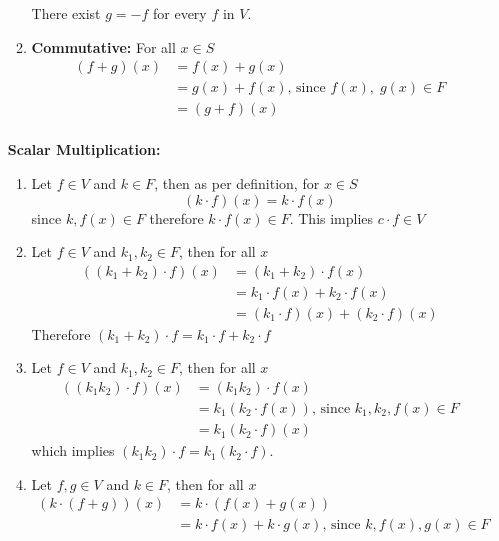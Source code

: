 \documentclass[a4paper, titlepage]{article}
\begin{document}
\begin{enumerate}[label=\textbf{\arabic*.}]
\begin{enumerate}[label=\textbf{\alph*}]
        There exist $g = -f$ for every $f$ in $V$.
        \item \textbf{Commutative: } For all $x \in S$ 
        \begin{align*}
            (f + g)(x) &= f(x) + g(x) \\
                       &= g(x) + f(x) \text{, since } f(x), \; g(x) \in F \\ 
                       &= (g + f)(x) \\
        \end{align*}
    \end{enumerate}
    \textbf{Scalar Multiplication: }
        \begin{enumerate}[label=\textbf{\alph*}]
            \item Let $f \in V$ and $k \in F$, then as per definition, for $x \in S$ 
            $$
                (k \cdot f)(x) = k\cdot f(x)
            $$
            since $k, f(x) \in F $ therefore $k\cdot f(x) \in F$. This 
            implies $c\cdot f \in V$
            \item Let $f \in V$ and $k_1, k_2 \in F$, then for all $x$
            \begin{align*}
                ((k_1 + k_2)\cdot f)(x) &= (k_1 + k_2)\cdot f(x) \\
                                        &= k_1\cdot f(x) + k_2\cdot f(x) \\
                                        &= (k_1\cdot f)(x) + (k_2\cdot f)(x)
            \end{align*}
            Therefore $(k_1 + k_2)\cdot f = k_1\cdot f + k_2\cdot f$
            \item Let $f \in V$ and $k_1, k_2 \in F$, then for all $x$
            \begin{align*}
                ((k_1k_2)\cdot f)(x) &= (k_1k_2)\cdot f(x) \\
                                        &= k_1(k_2\cdot f(x)) \text{, since } k_1, k_2, f(x) \in F\\
                                        &= k_1(k_2\cdot f)(x)
            \end{align*}
            which implies $(k_1k_2)\cdot f = k_1(k_2\cdot f)$.
            \item Let $f, g \in V$ and $k \in F$, then for all $x$
            \begin{align*}
                (k\cdot (f+g))(x) &= k\cdot (f(x) + g(x)) \\
                                        &= k\cdot f(x) + k\cdot g(x) \text{, since } k, f(x), g(x) \in F\\

\end{align*}
\end{enumerate}
\end{enumerate}
\end{document}
